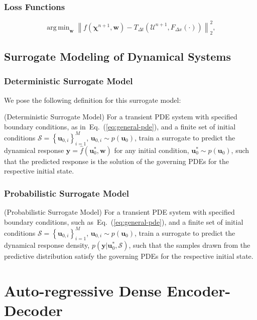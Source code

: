\documentclass{beamer}
\theoremstyle{remark}
\newcommand{\norm}[1]{\left\lVert #1 \right\rVert}
\DeclareMathOperator*{\argmin}{arg\,min}
\def\Eqref#1{Eq.~(\ref{#1})}
\begin{document}
\begin{frame}
\frametitle{Loss Functions}
\begin{equation}
    \argmin_{\textbf{w}} \norm{f\left(\bm{\chi}^{n+1}, \textbf{w}\right) -  T_{\Delta t}\left(\bm{\mathcal{U}}^{n+1}, F_{\Delta x}(\cdot)\right)}^{2}_{2},
    \label{eq:general-loss}
\end{equation}
\end{frame}

\subsection{Surrogate Modeling of Dynamical Systems}
\begin{frame}
\frametitle{Deterministic Surrogate Model}

We pose the following definition for this surrogate model:
\theoremstyle{definition}
\begin{definition}{(Deterministic Surrogate Model)}
For a transient PDE system with specified boundary conditions, as in~\Eqref{eq:general-pde}, and a finite set of initial conditions $\mathcal{S}=\left\{\bm{u}_{0,i}\right\}_{i=1}^{M}$, $\bm{u}_{0,i} \sim p\left(\bm{u}_{0}\right)$, train a surrogate to predict the dynamical response $\bm{y}=\hat{f}\left(\bm{u}_{0}^{*}, \textbf{w}\right)$ for any initial condition, $\bm{u}_{0}^{*} \sim p\left(\bm{u}_{0}\right)$, such that the predicted response is the solution of the governing PDEs for the respective initial state.
\end{definition}

\end{frame}

\begin{frame}
\frametitle{Probabilistic Surrogate Model}
\theoremstyle{definition}
\begin{definition}{(Probabilistic Surrogate Model)}
    For a transient PDE system with specified boundary conditions, such as~\Eqref{eq:general-pde}, and a finite set of initial conditions $\mathcal{S}=\left\{\bm{u}_{0,i}\right\}_{i=1}^{M}$, $\bm{u}_{0,i} \sim p\left(\bm{u}_{0}\right)$, train a surrogate to predict the dynamical response density, $p\left(\bm{y}| \bm{u}_{0}^{*}, \mathcal{S}\right)$, such that the samples drawn from the predictive distribution satisfy the governing PDEs for the respective initial state.
\end{definition}
\end{frame}

\section{Auto-regressive Dense Encoder-Decoder}
\end{document}
